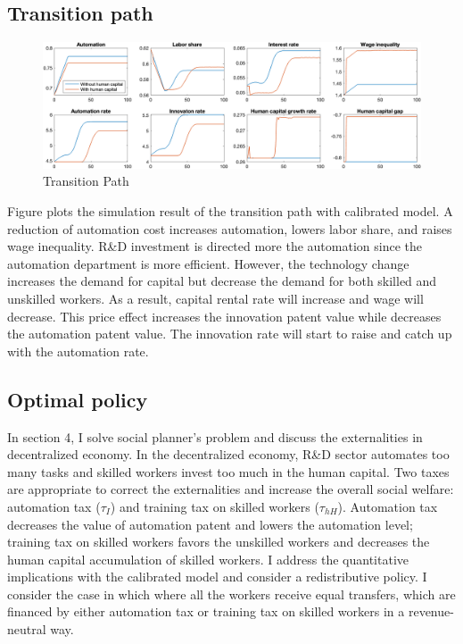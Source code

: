 \documentclass[12pt]{article}
\begin{document}
\subsection{Transition path}

\begin{figure}[h!]
\includegraphics[width=\textwidth]{Transition}
\caption{Transition Path}
\label{transition}
\end{figure}

Figure \label{transition} plots the simulation result of the transition path with calibrated model. A reduction of automation cost increases automation, lowers labor share, and raises wage inequality. R\&D investment is directed more the automation since the automation department is more efficient. However, the technology change increases the demand for capital but decrease the demand for both skilled and unskilled workers. As a result, capital rental rate will increase and wage will decrease. This price effect increases the innovation patent value while decreases the automation patent value. The innovation rate will start to raise and catch up with the automation rate. 


\subsection{Optimal policy}
In section 4, I solve social planner's problem and discuss the externalities in decentralized economy. In the decentralized economy, R\&D sector automates too many tasks and skilled workers invest too much in the human capital. Two taxes are appropriate to correct the externalities and increase the overall social welfare: automation tax ($\tau_I$) and training tax on skilled workers ($\tau_{hH}$). Automation tax decreases the value of automation patent and lowers the automation level; training tax on skilled workers favors the unskilled workers and decreases the human capital accumulation of skilled workers. I address the quantitative implications with the calibrated model and consider a redistributive policy. I consider the case in which where all the workers receive equal transfers, which are financed by either automation tax or training tax on skilled workers in a revenue-neutral way. 
\end{document}
